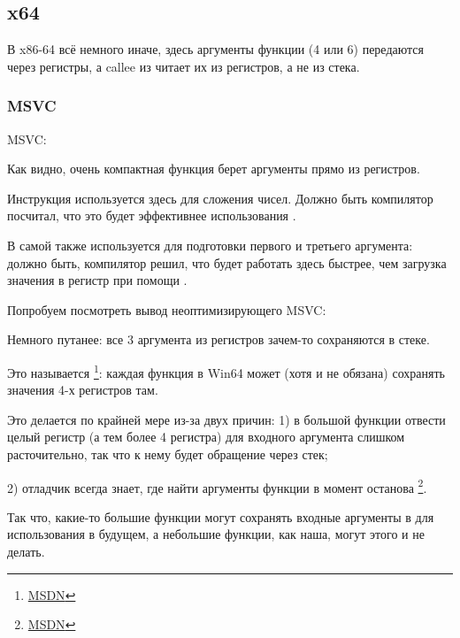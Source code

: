 \subsection{x64}

В x86-64 всё немного иначе, здесь аргументы функции (4 или 6) передаются через регистры, 
а \gls{callee} из читает их из регистров, а не из стека.

\subsubsection{MSVC}

\Optimizing MSVC:



Как видно, очень компактная функция \ttf берет аргументы прямо из регистров.

Инструкция \LEA используется здесь для сложения чисел. 
Должно быть компилятор посчитал, что это будет эффективнее использования .

В самой \main{} \LEA{} также используется для подготовки первого и третьего аргумента: должно быть,
компилятор решил, что \LEA{} будет работать здесь быстрее, чем загрузка значения в регистр при помощи \MOV.

Попробуем посмотреть вывод неоптимизирующего MSVC:



Немного путанее: все 3 аргумента из регистров зачем-то сохраняются в стеке.

\label{shadow_space}
Это называется  \footnote{\href{http://go.yurichev.com/17256}{MSDN}}: 
каждая функция в Win64 может (хотя и не обязана) сохранять значения 4-х регистров там.

Это делается по крайней мере из-за двух причин: 
1) в большой функции отвести целый регистр (а тем более 4 регистра) для входного аргумента 
слишком расточительно, так что к нему будет обращение через стек;

2) отладчик всегда знает, где найти аргументы функции в момент останова
\footnote{\href{http://go.yurichev.com/17257}{MSDN}}.

Так что, какие-то большие функции могут сохранять входные аргументы в  
для использования в будущем, а небольшие функции, как наша, могут этого и не делать.

